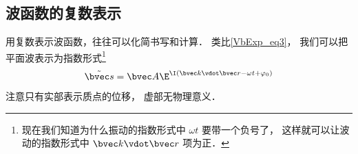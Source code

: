 \subsection{波函数的复数表示}

用复数表示波函数，往往可以化简书写和计算． 类比\autoref{VbExp_eq3}， 我们可以把平面波表示为指数形式\footnote{现在我们知道为什么振动的指数形式中 $\omega t$ 要带一个负号了， 这样就可以让波动的指数形式中 $\bvec k\vdot \bvec r$ 项为正．}
\begin{equation}
\tilde {\bvec s} = \bvec A \E^{\I( \bvec k \vdot \bvec r - \omega t + \varphi_0)}
\end{equation}
注意只有实部表示质点的位移， 虚部无物理意义．

